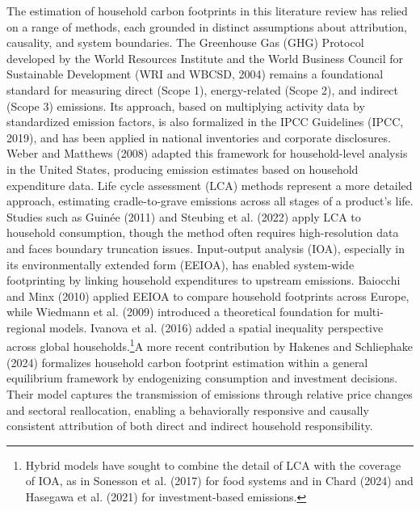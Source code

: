 \documentclass[12pt,a4paper]{article}%
\begin{document}
The estimation of household carbon footprints in this literature review has relied on a range of methods, each grounded in distinct assumptions about attribution, causality, and system boundaries. The Greenhouse Gas (GHG) Protocol developed by the World Resources Institute and the World Business Council for Sustainable Development (WRI and WBCSD, 2004) remains a foundational standard for measuring direct (Scope 1), energy-related (Scope 2), and indirect (Scope 3) emissions. Its approach, based on multiplying activity data by standardized emission factors, is also formalized in the IPCC Guidelines (IPCC, 2019), and has been applied in national inventories and corporate disclosures. Weber and Matthews (2008) adapted this framework for household-level analysis in the United States, producing emission estimates based on household expenditure data. Life cycle assessment (LCA) methods represent a more detailed approach, estimating cradle-to-grave emissions across all stages of a product's life. Studies such as Guinée (2011) and Steubing et al. (2022) apply LCA to household consumption, though the method often requires high-resolution data and faces boundary truncation issues. Input-output analysis (IOA), especially in its environmentally extended form (EEIOA), has enabled system-wide footprinting by linking household expenditures to upstream emissions. Baiocchi and Minx (2010) applied EEIOA to compare household footprints across Europe, while Wiedmann et al. (2009) introduced a theoretical foundation for multi-regional models. Ivanova et al. (2016) added a spatial inequality perspective across global households.\footnote{Hybrid models have sought to combine the detail of LCA with the coverage of IOA, as in Sonesson et al. (2017) for food systems and in Chard (2024) and Hasegawa et al. (2021) for investment-based emissions.}A more recent contribution by Hakenes and Schliephake (2024) formalizes household carbon footprint estimation within a general equilibrium framework by endogenizing consumption and investment decisions. Their model captures the transmission of emissions through relative price changes and sectoral reallocation, enabling a behaviorally responsive and causally consistent attribution of both direct and indirect household responsibility.
\end{document}
